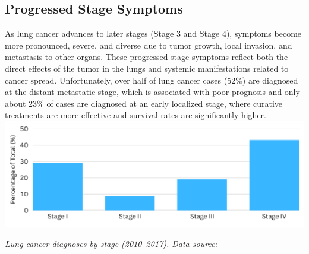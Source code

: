 \subsection{Progressed Stage Symptoms}
As lung cancer advances to later stages (Stage 3 and Stage 4), symptoms become more pronounced, 
severe, and diverse due to tumor growth, local invasion, and metastasis to other organs. These 
progressed stage symptoms reflect both the direct effects of the tumor in the lungs and systemic 
manifestations related to cancer spread. Unfortunately, over half of lung cancer cases (52\%) are 
diagnosed at the distant metastatic stage, which is associated with poor prognosis and only about 
23\% of cases are diagnosed at an early localized stage, where curative treatments are more 
effective and survival rates are significantly higher.\\

\includegraphics[width=\textwidth]{../assets/03-clinical/stages-diagnosis.png}  

\begin{center}
    \textit{Lung cancer diagnoses by stage (2010--2017). Data source:\cite{jco2022}}
\end{center}

